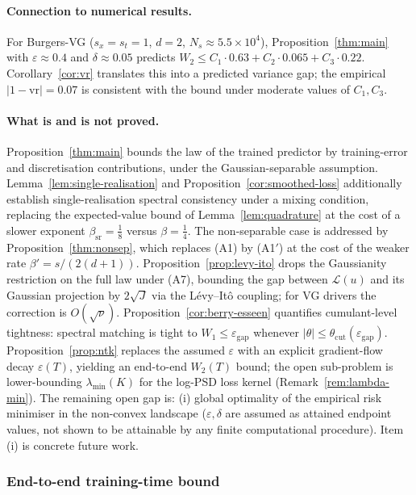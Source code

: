 \documentclass[review,12pt]{elsarticle}
\begin{document}
\paragraph{Connection to numerical results.}
For Burgers-VG (\(s_x = s_t = 1\), \(d = 2\),
\(N_s \approx 5.5 \times 10^4\)),
Proposition~\ref{thm:main} with \(\varepsilon \approx 0.4\) and
\(\delta \approx 0.05\) predicts
\(W_2 \le C_1 \cdot 0.63 + C_2 \cdot 0.065 + C_3 \cdot 0.22\).
Corollary~\ref{cor:vr} translates this into a predicted variance gap;
the empirical \(|1 - \mathrm{vr}| = 0.07\) is consistent with the
bound under moderate values of \(C_1, C_3\).

\paragraph{What is and is not proved.}
Proposition~\ref{thm:main} bounds the law of the trained predictor by
training-error and discretisation contributions, under the
Gaussian-separable assumption. Lemma~\ref{lem:single-realisation}
and Proposition~\ref{cor:smoothed-loss} additionally establish
single-realisation spectral consistency under a mixing condition,
replacing the expected-value bound of Lemma~\ref{lem:quadrature}
at the cost of a slower exponent \(\beta_{\mathrm{sr}} = \tfrac{1}{8}\)
versus \(\beta = \tfrac{1}{4}\). The non-separable case is addressed by Proposition~\ref{thm:nonsep},
which replaces (A1) by (A1$'$) at the cost of the weaker rate
\(\beta' = s/(2(d+1))\).
Proposition~\ref{prop:levy-ito} drops the Gaussianity restriction on the
full law under (A7), bounding the gap between $\mathcal{L}(u)$ and its
Gaussian projection by $2\sqrt{J}$ via the L\'evy--It\^o coupling;
for VG drivers the correction is $O(\sqrt\nu)$.
Proposition~\ref{cor:berry-esseen} quantifies cumulant-level tightness:
spectral matching is tight to $W_1\le\varepsilon_{\mathrm{gap}}$ whenever
$|\theta|\le\theta_{\mathrm{cut}}(\varepsilon_{\mathrm{gap}})$.
Proposition~\ref{prop:ntk} replaces the assumed $\varepsilon$ with an
explicit gradient-flow decay $\varepsilon(T)$, yielding an end-to-end
$W_2(T)$ bound; the open sub-problem is lower-bounding
$\lambda_{\min}(K)$ for the log-PSD loss kernel
(Remark~\ref{rem:lambda-min}).
The remaining open gap is:
(i) global optimality of the empirical risk minimiser in the non-convex
landscape (\(\varepsilon, \delta\) are assumed as attained endpoint
values, not shown to be attainable by any finite computational procedure).
Item (i) is concrete future work.

\subsubsection{End-to-end training-time bound}
\label{subsec:training-time}
\end{document}
